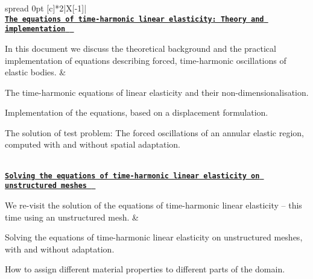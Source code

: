 \begin{longtabu} spread 0pt [c]{*{2}{|X[-1]}|}
\hline
{}\\
\href{../../time_harmonic_linear_elasticity/elastic_annulus/html/index.html}{\tt {\bfseries The equations of time-\/harmonic linear elasticity\+: Theory and implementation } }

In this document we discuss the theoretical background and the practical implementation of equations describing forced, time-\/harmonic oscillations of elastic bodies.  &
\begin{DoxyItemize}
\item The time-\/harmonic equations of linear elasticity and their non-\/dimensionalisation.
\item Implementation of the equations, based on a displacement formulation.
\item The solution of test problem\+: The forced oscillations of an annular elastic region, computed with and without spatial adaptation.
\end{DoxyItemize}

\\
\href{../../time_harmonic_linear_elasticity/unstructured_elastic_annulus/html/index.html}{\tt {\bfseries Solving the equations of time-\/harmonic linear elasticity on unstructured meshes } }

We re-\/visit the solution of the equations of time-\/harmonic linear elasticity -- this time using an unstructured mesh.  &
\begin{DoxyItemize}
\item Solving the equations of time-\/harmonic linear elasticity on unstructured meshes, with and without adaptation.
\item How to assign different material properties to different parts of the domain.
\end{DoxyItemize}



\\
\end{longtabu}
